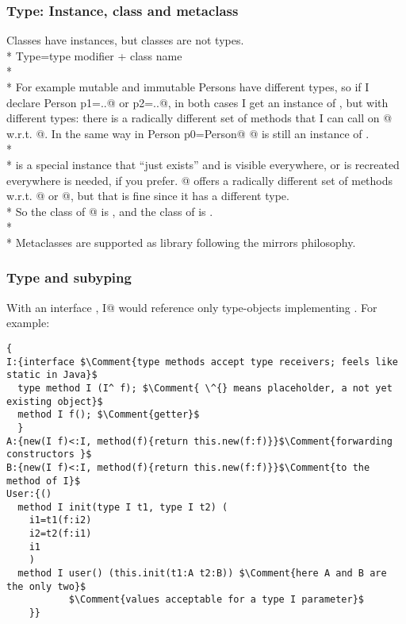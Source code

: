 \begin{frame}[fragile]
\frametitle{Type: Instance, class and metaclass}
Classes have instances, but classes are not types.
\\*
Type=type modifier + class name
\\*${}_{}$\\*
For example mutable and immutable Persons
have different types,
so if I declare \Q@mut Person p1=..@ or \Q@Person p2=..@,
in both cases I get an instance of \Q@Person@,
 but with different types:
there is a radically different set of methods that I can call
on @ w.r.t. @.
In the same way in \Q@type Person p0=Person@
@ is still an instance of \Q@Person@.
\\*${}_{}$\\*
\Q@Person@ is a special instance that ``just exists''
and is visible everywhere, or is recreated everywhere is needed, if you prefer.
@ offers a radically different set of methods w.r.t. @ or @,
but that is fine since it has a different type.\\*
So the class of @ is \Q@Person@, and the class of \Q@Person@ is \Q@Person@.
\\*${}_{}$\\*
Metaclasses are supported as library following the mirrors philosophy.
\end{frame}


\begin{frame}[fragile]
\frametitle{Type and subyping}
With an interface \Q@I@,
\Q@type I@ would reference only type-objects implementing \Q@I@.
For example:
\begin{NiceCode}{59ex}{0.8}
\begin{lstlisting}
{
I:{interface $\Comment{type methods accept type receivers; feels like static in Java}$
  type method I (I^ f); $\Comment{ \^{} means placeholder, a not yet existing object}$
  method I f(); $\Comment{getter}$
  }
A:{new(I f)<:I, method(f){return this.new(f:f)}}$\Comment{forwarding constructors }$
B:{new(I f)<:I, method(f){return this.new(f:f)}}$\Comment{to the method of I}$
User:{()
  method I init(type I t1, type I t2) (
    i1=t1(f:i2)
    i2=t2(f:i1)
    i1
    )
  method I user() (this.init(t1:A t2:B)) $\Comment{here A and B are the only two}$
           $\Comment{values acceptable for a type I parameter}$
    }}
\end{lstlisting}
\end{NiceCode}
\end{frame}

